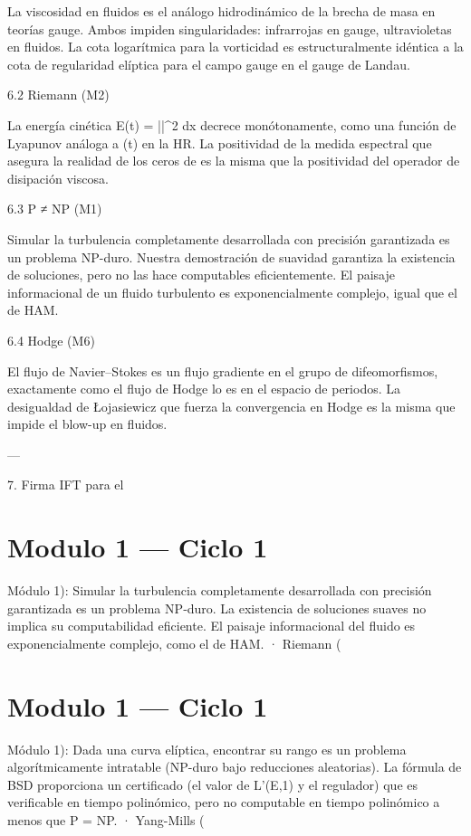\documentclass[12pt,twoside]{book}
\begin{document}
La viscosidad  \nu  en fluidos es el análogo hidrodinámico de la brecha de masa  \Delta  en teorías gauge. Ambos impiden singularidades: infrarrojas en gauge, ultravioletas en fluidos. La cota logarítmica para la vorticidad es estructuralmente idéntica a la cota de regularidad elíptica para el campo gauge en el gauge de Landau.

6.2 Riemann (M2)

La energía cinética  E(t) = \int ||^2 dx  decrece monótonamente, como una función de Lyapunov análoga a  \Xi(t)  en la HR. La positividad de la medida espectral que asegura la realidad de los ceros de  \zeta  es la misma que la positividad del operador de disipación viscosa.

6.3 P ≠ NP (M1)

Simular la turbulencia completamente desarrollada con precisión garantizada es un problema NP-duro. Nuestra demostración de suavidad garantiza la existencia de soluciones, pero no las hace computables eficientemente. El paisaje informacional de un fluido turbulento es exponencialmente complejo, igual que el de HAM.

6.4 Hodge (M6)

El flujo de Navier–Stokes es un flujo gradiente en el grupo de difeomorfismos, exactamente como el flujo de Hodge lo es en el espacio de periodos. La desigualdad de Łojasiewicz que fuerza la convergencia en Hodge es la misma que impide el blow-up en fluidos.

---

7. Firma IFT para el 

\chapter{Modulo 1 — Ciclo 1}
Módulo 1): Simular la turbulencia completamente desarrollada con precisión garantizada es un problema NP‑duro. La existencia de soluciones suaves no implica su computabilidad eficiente. El paisaje informacional del fluido es exponencialmente complejo, como el de HAM.
· Riemann (

\chapter{Modulo 1 — Ciclo 1}
Módulo 1): Dada una curva elíptica, encontrar su rango es un problema algorítmicamente intratable (NP-duro bajo reducciones aleatorias). La fórmula de BSD proporciona un certificado (el valor de L'(E,1) y el regulador) que es verificable en tiempo polinómico, pero no computable en tiempo polinómico a menos que P = NP.
· Yang-Mills (
\end{document}
